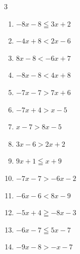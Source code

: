 \begin{multicols}{3}
\begin{enumerate}
  \item $-8x-8\leqq 3x+2$


  \item $-4x+8<2x-6$


  \item $8x-8<-6x+7$


  \item $-8x-8<4x+8$


  \item $-7x-7>7x+6$


  \item $-7x+4>x-5$


  \item $x-7>8x-5$


  \item $3x-6>2x+2$

        \phantom{$\displaystyle x>8$}

  \item $9x+1\leqq x+9$

        \phantom{$\displaystyle x\leqq 1$}

  \item $-7x-7>-6x-2$

        \phantom{$\displaystyle x<-5$}

\columnbreak %

  \item $-6x-6<8x-9$


  \item $-5x+4\geqq -8x-3$


  \item $-6x-7\leqq 5x-7$

        \phantom{$\displaystyle x\geqq 0$}

  \item $-9x-8>-x-7$


\end{enumerate}
\end{multicols}
